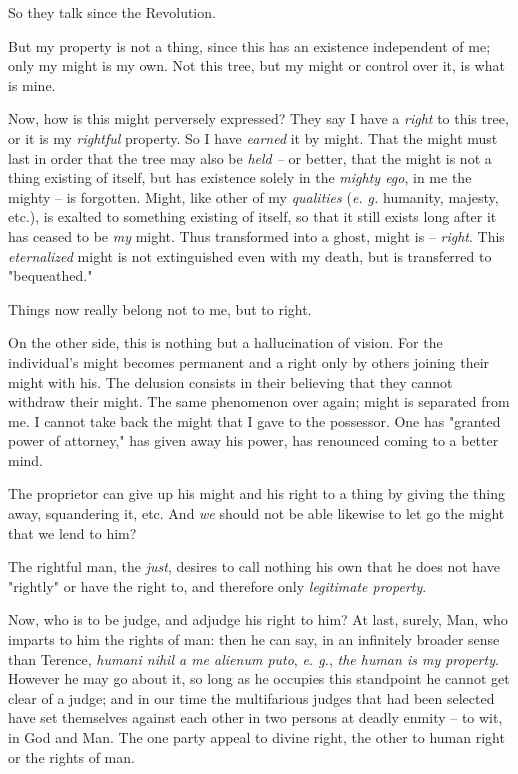 So they talk since the Revolution.

But my property is not a thing, since this has an existence independent of me; 
only my might is my own. Not this tree, but my might or control over it, is 
what is mine.

Now, how is this might perversely expressed? They say I have a \textit{right} 
to this tree, or it is my \textit{rightful} property. So I have 
\textit{earned} it by might. That the might must last in order that the tree 
may also be \textit{held --} or better, that the might is not a thing existing 
of itself, but has existence solely in the \textit{mighty ego}, in me the 
mighty -- is forgotten. Might, like other of my \textit{qualities} (\textit{e. 
g.} humanity, majesty, etc.), is exalted to something existing of itself, so 
that it still exists long after it has ceased to be \textit{my} might. Thus 
transformed into a ghost, might is -- \textit{right}. This 
\textit{eternalized} might is not extinguished even with my death, but is 
transferred to "{}bequeathed."{}

Things now really belong not to me, but to right.

On the other side, this is nothing but a hallucination of vision. For the 
individual's might becomes permanent and a right only by others joining their 
might with his. The delusion consists in their believing that they cannot 
withdraw their might. The same phenomenon over again; might is separated from 
me. I cannot take back the might that I gave to the possessor. One has 
"{}granted power of attorney,"{} has given away his power, has renounced 
coming to a better mind.

The proprietor can give up his might and his right to a thing by giving the 
thing away, squandering it, etc. And \textit{we} should not be able likewise 
to let go the might that we lend to him?

The rightful man, the \textit{just}, desires to call nothing his own that he 
does not have "{}rightly"{} or have the right to, and therefore only 
\textit{legitimate property}.

Now, who is to be judge, and adjudge his right to him? At last, surely, Man, 
who imparts to him the rights of man: then he can say, in an infinitely 
broader sense than Terence, \textit{humani nihil a me alienum puto}, 
\textit{e. g.}, \textit{the human is my property}. However he may go about it, 
so long as he occupies this standpoint he cannot get clear of a judge; and in 
our time the multifarious judges that had been selected have set themselves 
against each other in two persons at deadly enmity -- to wit, in God and Man. 
The one party appeal to divine right, the other to human right or the rights 
of man.

